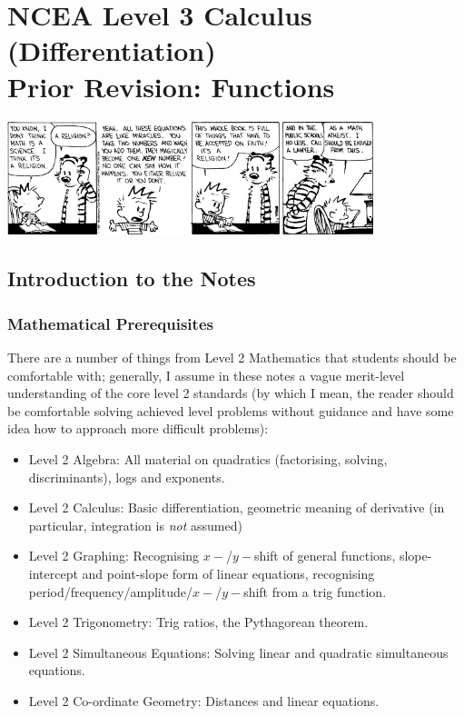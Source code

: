 


\section*{NCEA Level 3 Calculus (Differentiation)\\Prior Revision: Functions}

\begin{center}
  \includegraphics[width=0.8\textwidth]{hobbes}
\end{center}

\subsection*{Introduction to the Notes}
\subsubsection*{Mathematical Prerequisites}
There are a number of things from Level 2 Mathematics that students should be
comfortable with; generally, I assume in these notes a vague merit-level understanding
of the core level 2 standards (by which I mean, the reader should be comfortable solving
achieved level problems without guidance and have some idea how to approach more difficult
problems):
\begin{itemize}
  \item Level 2 Algebra: All material on quadratics (factorising, solving, discriminants), logs and exponents.
  \item Level 2 Calculus: Basic differentiation, geometric meaning of derivative (in particular, integration is \textit{not} assumed)
  \item Level 2 Graphing: Recognising $ x-$/$ y-$shift of general functions, slope-intercept and point-slope form of linear equations,
                          recognising period/frequency/amplitude/$ x-$/$ y-$shift from a trig function.
  \item Level 2 Trigonometry: Trig ratios, the Pythagorean theorem.
  \item Level 2 Simultaneous Equations: Solving linear and quadratic simultaneous equations.
  \item Level 2 Co-ordinate Geometry: Distances and linear equations.
\end{itemize}

